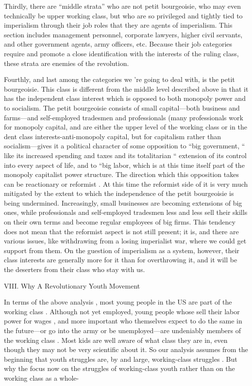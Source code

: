 \documentclass[12pt, titlepage]{article}
\begin{document}
{\begin{spacing}{1.10}
Thirdly, there are ``middle strata'' who are not petit bourgeoisie, who may even technically be upper working class, but who are so privileged and tightly tied to imperialism through their job roles that they are agents of imperialism. This section includes management personnel, corporate lawyers, higher civil servants, and other government agents, army officers, etc. Because their job categories require and promote a close identification with the interests of the ruling class, these strata are enemies of the revolution.

Fourthly, and last among the categories we 're going to deal with, is the petit bourgeoisie. This class is different from the middle level described above in that it has the independent class interest which is opposed to both monopoly power and to socialism. The petit bourgeoisie consists of small capital—both business and farms—and self-employed tradesmen and professionals (many professionals work for monopoly capital, and are either the upper level of the working class or in the dent class interests-anti-monopoly capital, but for capitalism rather than socialism—gives it a political character of some opposition to ``big government, `` like its increased spending and taxes and its totalitarian `` extension of its control into every aspect of life, and to ``big labor, which is at this time itself part of the monopoly capitalist power structure. The direction which this opposition takes can be reactionary or reformist . At this time the reformist side of it is very much mitigated by the extent to which the independence of the petit bourgeoisie is being undermined. Increasingly, small businesses are becoming extensions of big ones, while professionals and self-employed tradesmen less and less sell their skills on their own terms and become regular employees of big firms. This tendency does not mean that the reformist aspect is not still present; it is, and there are various issues, like withdrawing from a losing imperialist war, where we could get support from them. On the guestion of imperialism as a system, however, their class interests are generally more for it than for overthrowing it, and it will be the deserters from their class who stay with us.

\begin{center}
VIII. Why A Revolutionary Youth Movement
\end{center}

In terms of the above analysis , most young people in the US are part of the working class . Although not yet employed, young people whose sell their labor power for wages , and more important who themselves expect to do the same in the future—or go into the army or be unemployed—are undeniably members of the working class . Most kids are well aware of what class they are in, even though they may not be very scientific about it. So our analysis assumes from the beginning that youth struggles are, by and large, working-class struggles . But why the focus now on the struggles of working-class youth rather than on the working class as a whole-


\end{spacing}}
\end{document}
